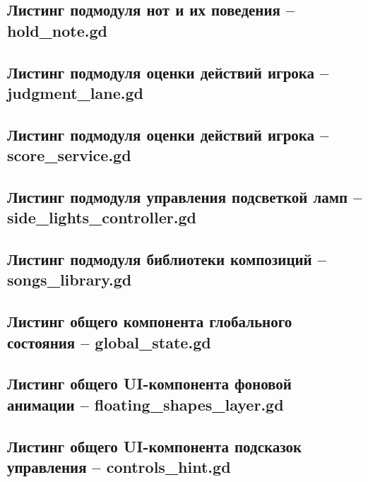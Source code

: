 \documentclass[utf8, russian]{eskdtext}
\numberwithin{equation}{section}
\begin{document}
\subsection*{Листинг подмодуля нот и их поведения -- hold\_note.gd}


\subsection*{Листинг подмодуля оценки действий игрока -- judgment\_lane.gd}


\subsection*{Листинг подмодуля оценки действий игрока -- score\_service.gd}


\subsection*{Листинг подмодуля управления подсветкой ламп -- side\_lights\_controller.gd}


\subsection*{Листинг подмодуля библиотеки композиций -- songs\_library.gd}


\subsection*{Листинг общего компонента глобального состояния -- global\_state.gd}


\subsection*{Листинг общего UI-компонента фоновой анимации -- floating\_shapes\_layer.gd}


\subsection*{Листинг общего UI-компонента подсказок управления -- controls\_hint.gd}

\end{document}
